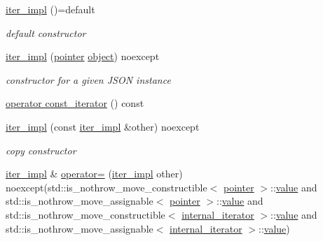 \begin{DoxyCompactItemize}
\item 
\hyperlink{classnlohmann_1_1basic__json_1_1iter__impl_a3e45be67e4384b3eacb72bd6147a6a91}{iter\+\_\+impl} ()=default
\begin{DoxyCompactList}\small\item\em default constructor \end{DoxyCompactList}\item 
\hyperlink{classnlohmann_1_1basic__json_1_1iter__impl_aa496f5348569e75d65592f25e1664770}{iter\+\_\+impl} (\hyperlink{classnlohmann_1_1basic__json_1_1iter__impl_a3dddd7fa38b36e2531700ceb4a1ce9a8}{pointer} \hyperlink{classnlohmann_1_1basic__json_a9f42ee7d10eee2d5a73fd94ca7f767ca}{object}) noexcept
\begin{DoxyCompactList}\small\item\em constructor for a given J\+S\+ON instance \end{DoxyCompactList}\item 
\hyperlink{classnlohmann_1_1basic__json_1_1iter__impl_af1963645f99993ac5d0d2f8516e07212}{operator const\+\_\+iterator} () const
\item 
\hyperlink{classnlohmann_1_1basic__json_1_1iter__impl_a94c010c069b5aed9e064e0579eac9a64}{iter\+\_\+impl} (const \hyperlink{classnlohmann_1_1basic__json_1_1iter__impl}{iter\+\_\+impl} \&other) noexcept
\begin{DoxyCompactList}\small\item\em copy constructor \end{DoxyCompactList}\item 
\hyperlink{classnlohmann_1_1basic__json_1_1iter__impl}{iter\+\_\+impl} \& \hyperlink{classnlohmann_1_1basic__json_1_1iter__impl_a083d9d5465de7ddfb6108f404ce54be3}{operator=} (\hyperlink{classnlohmann_1_1basic__json_1_1iter__impl}{iter\+\_\+impl} other) noexcept(std\+::is\+\_\+nothrow\+\_\+move\+\_\+constructible$<$ \hyperlink{classnlohmann_1_1basic__json_1_1iter__impl_a3dddd7fa38b36e2531700ceb4a1ce9a8}{pointer} $>$\+::\hyperlink{classnlohmann_1_1basic__json_1_1iter__impl_a92e849ca687355935c02f492be936b68}{value} and std\+::is\+\_\+nothrow\+\_\+move\+\_\+assignable$<$ \hyperlink{classnlohmann_1_1basic__json_1_1iter__impl_a3dddd7fa38b36e2531700ceb4a1ce9a8}{pointer} $>$\+::\hyperlink{classnlohmann_1_1basic__json_1_1iter__impl_a92e849ca687355935c02f492be936b68}{value} and std\+::is\+\_\+nothrow\+\_\+move\+\_\+constructible$<$ \hyperlink{structnlohmann_1_1basic__json_1_1internal__iterator}{internal\+\_\+iterator} $>$\+::\hyperlink{classnlohmann_1_1basic__json_1_1iter__impl_a92e849ca687355935c02f492be936b68}{value} and std\+::is\+\_\+nothrow\+\_\+move\+\_\+assignable$<$ \hyperlink{structnlohmann_1_1basic__json_1_1internal__iterator}{internal\+\_\+iterator} $>$\+::\hyperlink{classnlohmann_1_1basic__json_1_1iter__impl_a92e849ca687355935c02f492be936b68}{value})

\end{DoxyCompactItemize}
